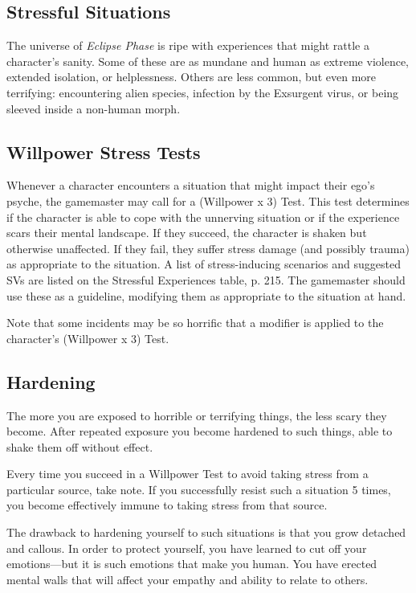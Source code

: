 \subsection{Stressful Situations}

The universe of \textit{Eclipse Phase} is ripe with experiences 
that might rattle a character's sanity. Some of these are 
as mundane and human as extreme violence, extended 
isolation, or helplessness. Others are less common, but 
even more terrifying: encountering alien species, infection
by the Exsurgent virus, or being sleeved inside a
non-human morph.

\subsection{Willpower Stress Tests}

Whenever a character encounters a situation that 
might impact their ego's psyche, the gamemaster may 
call for a (Willpower x 3) Test. This test determines if 
the character is able to cope with the unnerving situation
or if the experience scars their mental landscape.
If they succeed, the character is shaken but otherwise 
unaffected. If they fail, they suffer stress damage (and 
possibly trauma) as appropriate to the situation. A 
list of stress-inducing scenarios and suggested SVs are 
listed on the Stressful Experiences table, p. 215. The 
gamemaster should use these as a guideline, modifying 
them as appropriate to the situation at hand.

Note that some incidents may be so horrific that a 
modifier is applied to the character's (Willpower x 3) 
Test.

\subsection{Hardening}

The more you are exposed to horrible or terrifying 
things, the less scary they become. After repeated exposure
you become hardened to such things, able to
shake them off without effect.

Every time you succeed in a Willpower Test to avoid 
taking stress from a particular source, take note. If you 
successfully resist such a situation 5 times, you become 
effectively immune to taking stress from that source.

The drawback to hardening yourself to such situations
is that you grow detached and callous. In order
to protect yourself, you have learned to cut off your 
emotions—but it is such emotions that make you 
human. You have erected mental walls that will affect 
your empathy and ability to relate to others.

